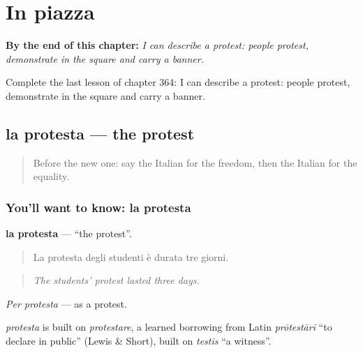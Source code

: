 
\chapter{In piazza}
\label{ch:it-in-piazza}

\begin{chapteropening}
\textbf{By the end of this chapter:} \emph{I can describe a protest: people protest, demonstrate in the square and carry a banner.}

Complete the last lesson of chapter 364: I can describe a protest: people protest, demonstrate in the square and carry a banner.
\end{chapteropening}

\section[la protesta]{la protesta — the protest}

\label{lesson:IT-C364-protesta}



\begin{quote}
Before the new one: say the Italian for the freedom, then the Italian for the equality.
\end{quote}

\subsection*{You'll want to know: la protesta}
\textbf{la protesta} — \textquotedblleft{}the protest\textquotedblright{}.

\begin{quote}
La protesta degli studenti è durata tre giorni.
\end{quote}

\begin{quote}
\emph{The students' protest lasted three days.}
\end{quote}

\emph{Per protesta} — as a protest.

\begin{cousinweb}
\emph{protesta} is built on \emph{protestare}, a learned borrowing from Latin \emph{prōtestārī} \textquotedblleft{}to declare in public\textquotedblright{} (Lewis \& Short), built on \emph{testis} \textquotedblleft{}a witness\textquotedblright{}.
\end{cousinweb}

